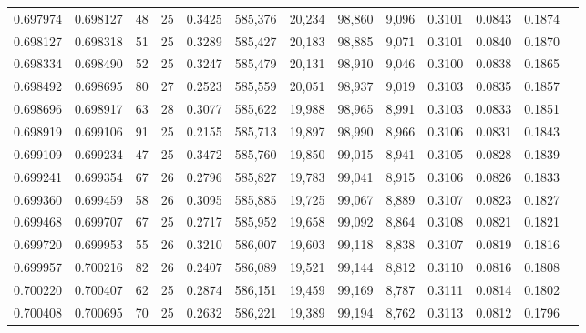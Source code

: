 \begin{tabular}{rrrrrrrrrrrrr}
0.697974 & 0.698127 &  48 &  25 &                                     0.3425 & 585,376 &  20,234 &  98,860 &   9,096 & 0.3101 & 0.0843 & 0.1874 \\
0.698127 & 0.698318 &  51 &  25 &                                     0.3289 & 585,427 &  20,183 &  98,885 &   9,071 & 0.3101 & 0.0840 & 0.1870 \\
0.698334 & 0.698490 &  52 &  25 &                                     0.3247 & 585,479 &  20,131 &  98,910 &   9,046 & 0.3100 & 0.0838 & 0.1865 \\
0.698492 & 0.698695 &  80 &  27 &                                     0.2523 & 585,559 &  20,051 &  98,937 &   9,019 & 0.3103 & 0.0835 & 0.1857 \\
0.698696 & 0.698917 &  63 &  28 &                                     0.3077 & 585,622 &  19,988 &  98,965 &   8,991 & 0.3103 & 0.0833 & 0.1851 \\
0.698919 & 0.699106 &  91 &  25 &                                     0.2155 & 585,713 &  19,897 &  98,990 &   8,966 & 0.3106 & 0.0831 & 0.1843 \\
0.699109 & 0.699234 &  47 &  25 &                                     0.3472 & 585,760 &  19,850 &  99,015 &   8,941 & 0.3105 & 0.0828 & 0.1839 \\
0.699241 & 0.699354 &  67 &  26 &                                     0.2796 & 585,827 &  19,783 &  99,041 &   8,915 & 0.3106 & 0.0826 & 0.1833 \\
0.699360 & 0.699459 &  58 &  26 &                                     0.3095 & 585,885 &  19,725 &  99,067 &   8,889 & 0.3107 & 0.0823 & 0.1827 \\
0.699468 & 0.699707 &  67 &  25 &                                     0.2717 & 585,952 &  19,658 &  99,092 &   8,864 & 0.3108 & 0.0821 & 0.1821 \\
0.699720 & 0.699953 &  55 &  26 &                                     0.3210 & 586,007 &  19,603 &  99,118 &   8,838 & 0.3107 & 0.0819 & 0.1816 \\
0.699957 & 0.700216 &  82 &  26 &                                     0.2407 & 586,089 &  19,521 &  99,144 &   8,812 & 0.3110 & 0.0816 & 0.1808 \\
0.700220 & 0.700407 &  62 &  25 &                                     0.2874 & 586,151 &  19,459 &  99,169 &   8,787 & 0.3111 & 0.0814 & 0.1802 \\
0.700408 & 0.700695 &  70 &  25 &                                     0.2632 & 586,221 &  19,389 &  99,194 &   8,762 & 0.3113 & 0.0812 & 0.1796 \\

\end{tabular}
